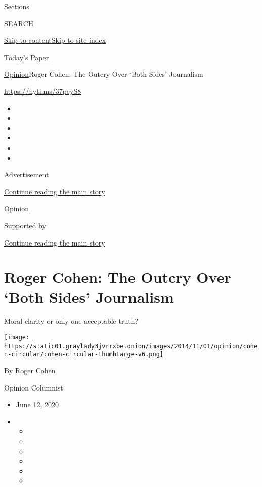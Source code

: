 Sections

SEARCH

\protect\hyperlink{site-content}{Skip to
content}\protect\hyperlink{site-index}{Skip to site index}

\href{https://myaccount.nytimes3xbfgragh.onion/auth/login?response_type=cookie\&client_id=vi}{}

\href{https://www.nytimes3xbfgragh.onion/section/todayspaper}{Today's
Paper}

\href{/section/opinion}{Opinion}\textbar{}Roger Cohen: The Outcry Over
`Both Sides' Journalism

\url{https://nyti.ms/37peyS8}

\begin{itemize}
\item
\item
\item
\item
\item
\item
\end{itemize}

Advertisement

\protect\hyperlink{after-top}{Continue reading the main story}

\href{/section/opinion}{Opinion}

Supported by

\protect\hyperlink{after-sponsor}{Continue reading the main story}

\hypertarget{roger-cohen-the-outcry-over-both-sides-journalism}{%
\section{Roger Cohen: The Outcry Over `Both Sides'
Journalism}\label{roger-cohen-the-outcry-over-both-sides-journalism}}

Moral clarity or only one acceptable truth?

\href{https://www.nytimes3xbfgragh.onion/by/roger-cohen}{\texttt{[image: https://static01.graylady3jvrrxbe.onion/images/2014/11/01/opinion/cohen-circular/cohen-circular-thumbLarge-v6.png]}}

By \href{https://www.nytimes3xbfgragh.onion/by/roger-cohen}{Roger Cohen}

Opinion Columnist

\begin{itemize}
\item
  June 12, 2020
\item
  \begin{itemize}
  \item
  \item
  \item
  \item
  \item
  \item
  \end{itemize}
\end{itemize}

